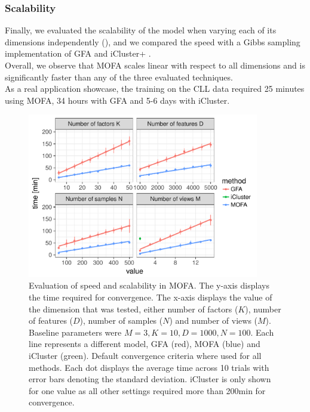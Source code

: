 \subsubsection{Scalability}
Finally, we evaluated the scalability of the model when varying each of its dimensions independently (), and we compared the speed with a Gibbs sampling implementation of GFA \cite{Leppaaho2017} and iCluster+ \cite{Mo2013}.\\
Overall, we observe that MOFA scales linear with respect to all dimensions and is significantly faster than any of the three evaluated techniques.\\
As a real application showcase, the training on the CLL data  required 25 minutes using MOFA, 34 hours with GFA and 5-6 days with iCluster.

\begin{figure}[H]
	\centering 	
	\includegraphics[width=0.9\textwidth]{MOFA_scalability}
	\caption{Evaluation of speed and scalability in MOFA. The y-axis displays the time required for convergence. The x-axis displays the value of the dimension that was tested, either number of factors ($K$), number of features ($D$), number of samples ($N$) and number of views ($M$). Baseline parameters were $M=3, K=10, D=1000, N=100$. Each line represents a different model, GFA (red), MOFA (blue) and iCluster (green). Default convergence criteria where used for all methods. Each dot displays the average time across 10 trials with error bars denoting the standard deviation. iCluster is only shown for one value as all other settings required more than 200min for convergence.
	}
	\label{fig:MOFA_nongaussian}
\end{figure}



